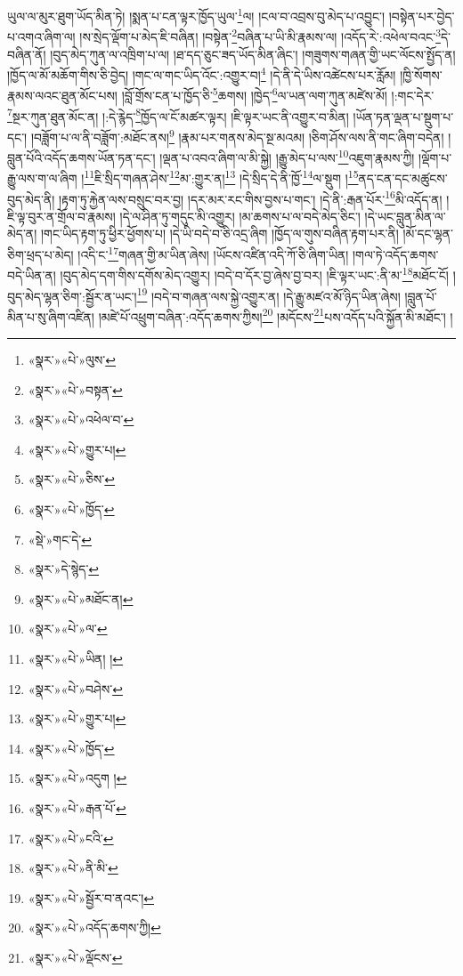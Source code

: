 ཡུལ་ལ་མུར་ཐུག་ཡོད་མིན་ཏེ། །སྨན་པ་ངན་ལྟར་ཁྱོད་ཡུལ་\footnote{«སྣར་»«པེ་»ལུས་}ལ། །ངལ་བ་འབྲས་བུ་མེད་པ་འབྱུང་། །བསྟེན་པར་བྱེད་པ་འགའ་ཞིག་ལ། །ས་སྲེད་ལྡོག་པ་མེད་ཇི་བཞིན། །བསྟེན་\footnote{«སྣར་»«པེ་»བསྟན་}བཞིན་པ་ཡི་མི་རྣམས་ལ། །འདོད་རེ་:འཕེལ་བའང་\footnote{«སྣར་»«པེ་»འཕེལ་བ་}དེ་བཞིན་ནོ། །བུད་མེད་ཀུན་ལ་འཁྲིག་པ་ལ། །ཐ་དད་ཅུང་ཟད་ཡོད་མིན་ཞིང་། །གཟུགས་གཞན་གྱི་ཡང་ལོངས་སྤྱོད་ན། །ཁྱོད་ལ་མོ་མཆོག་གིས་ཅི་བྱེད། །གང་ལ་གང་ཡིད་འོང་:འགྱུར་བ།\footnote{«སྣར་»«པེ་»གྱུར་པ།} །དེ་ནི་དེ་ཡིས་འཚེངས་པར་རློམ། །ཁྱི་སོགས་རྣམས་ལའང་ཐུན་མོང་པས། །བློ་གྲོས་ངན་པ་ཁྱོད་ཅི་\footnote{«སྣར་»«པེ་»ཅིས་}ཆགས། །ཁྱེད་\footnote{«སྣར་»«པེ་»ཁྱོད་}ལ་ཡན་ལག་ཀུན་མཛེས་མོ། །:གང་དེར་\footnote{«སྡེ་»གང་དེ་}སྔར་ཀུན་ཐུན་མོང་ན། །:དེ་རྙེད་\footnote{«སྣར་»དེ་སྙེད་}ཁྱོད་ལ་ངོ་མཚར་ལྟར། །ཇི་ལྟར་ཡང་ནི་འགྱུར་བ་མིན། །ཡོན་ཏན་ལྡན་པ་སྡུག་པ་དང་། །བཟློག་པ་ལ་ནི་བཟློག་:མཐོང་ནས།\footnote{«སྣར་»«པེ་»མཐོང་ན།} །རྣམ་པར་གནས་མེད་སྔ་མའམ། །ཅིག་ཤོས་ལས་ནི་གང་ཞིག་བདེན། །བླུན་པོའི་འདོད་ཆགས་ཡོན་ཏན་དང་། །ལྡན་པ་འབའ་ཞིག་ལ་མི་སྐྱེ། །རྒྱུ་མེད་པ་ལས་\footnote{«སྣར་»«པེ་»ལ་}འཇུག་རྣམས་ཀྱི། །ལྡོག་པ་རྒྱུ་ལས་ག་ལ་ཞིག །\footnote{«སྣར་»«པེ་»ཡིན། །}ཇི་སྲིད་གཞན་ཤེས་\footnote{«སྣར་»«པེ་»བཤེས་}མ་:གྱུར་ན།\footnote{«སྣར་»«པེ་»གྱུར་པ།} །དེ་སྲིད་དེ་ནི་ཁྱོ་\footnote{«སྣར་»«པེ་»ཁྱོད་}ལ་སྡུག །\footnote{«སྣར་»«པེ་»འདུག །}ནད་ངན་དང་མཚུངས་བུད་མེད་ནི། །རྟག་ཏུ་རྐྱེན་ལས་བསྲུང་བར་བྱ། །དར་མར་རང་གིས་བྱས་པ་གང་། །དེ་ནི་:རྒན་པོར་\footnote{«སྣར་»«པེ་»རྒན་པོ་}མི་འདོད་ན། །ཇི་ལྟ་བུར་ན་གྲོལ་བ་རྣམས། །དེ་ལ་ཤིན་ཏུ་གདུང་མི་འགྱུར། །མ་ཆགས་པ་ལ་བདེ་མེད་ཅིང་། །དེ་ཡང་བླུན་མིན་ལ་མེད་ན། །གང་ཡིད་རྟག་ཏུ་ཕྱིར་ཕྱོགས་པ། །དེ་ཡི་བདེ་བ་ཅི་འདྲ་ཞིག །ཁྱོད་ལ་གུས་བཞིན་རྟག་པར་ནི། །མོ་དང་ལྷན་ཅིག་ཕྲད་པ་མེད། །འདི་ང་\footnote{«སྣར་»«པེ་»ངའི་}གཞན་གྱི་མ་ཡིན་ཞེས། །ཡོངས་འཛིན་འདི་ཀོ་ཅི་ཞིག་ཡིན། །གལ་ཏེ་འདོད་ཆགས་བདེ་ཡིན་ན། །བུད་མེད་དག་གིས་དགོས་མེད་འགྱུར། །བདེ་བ་དོར་བྱ་ཞེས་བྱ་བར། །ཇི་ལྟར་ཡང་:ནི་མ་\footnote{«སྣར་»«པེ་»ནི་མི་}མཐོང་ངོ། །བུད་མེད་ལྷན་ཅིག་:སྦྱོར་ན་ཡང་།\footnote{«སྣར་»«པེ་»སྦྱོར་བ་ནའང་།} །བདེ་བ་གཞན་ལས་སྐྱེ་འགྱུར་ན། །དེ་རྒྱུ་མཛའ་མོ་ཉིད་ཡིན་ཞེས། །བླུན་པོ་མིན་པ་སུ་ཞིག་འཛིན། །མཛེ་པོ་འཕྲུག་བཞིན་:འདོད་ཆགས་ཀྱིས།\footnote{«སྣར་»«པེ་»འདོད་ཆགས་ཀྱི།} །མདོངས་\footnote{«སྣར་»«པེ་»ལྡོངས་}པས་འདོད་པའི་སྐྱོན་མི་མཐོང་། །
